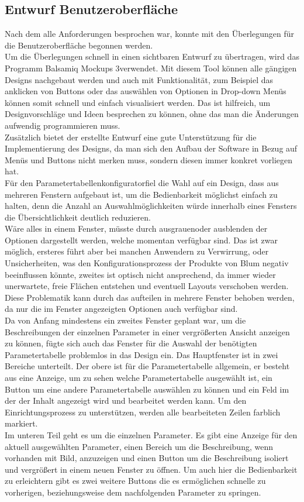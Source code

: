 \documentclass[12pt,a4paper]{article}
\begin{document}
\subsection{Entwurf Benutzeroberfläche}
Nach dem alle Anforderungen besprochen war, konnte mit den Überlegungen für die Benutzeroberfläche begonnen werden. \\
Um die Überlegungen schnell in einen sichtbaren Entwurf zu übertragen, wird das Programm \glqq Balsamiq Mockups 3\grqq\space verwendet. Mit diesem Tool können alle gängigen Designs nachgebaut werden und auch
 mit Funktionalität, zum Beispiel das anklicken von Buttons oder das auswählen von Optionen in Drop-down Menüs können somit schnell und einfach visualisiert werden. Das ist hilfreich, um Designvorschläge und Ideen besprechen zu können, ohne das man die Änderungen aufwendig programmieren muss.
\\Zusätzlich bietet der erstellte Entwurf eine gute Unterstützung für die Implementierung des Designs, da man sich den Aufbau der Software in Bezug auf Menüs und Buttons nicht merken muss, sondern diesen immer konkret vorliegen hat.
\\Für den \glqq Parametertabellenkonfigurator\grqq\space fiel die Wahl auf ein Design, dass aus mehreren Fenstern aufgebaut ist, um die Bedienbarkeit möglichst einfach zu halten, denn die Anzahl an Auswahlmöglichkeiten würde innerhalb eines Fensters die Übersichtlichkeit deutlich reduzieren.
\\ Wäre alles in einem Fenster, müsste durch \glqq ausgrauen\grqq\space oder ausblenden der Optionen dargestellt werden, welche momentan verfügbar sind. Das ist zwar möglich, ersteres führt aber bei manchen Anwendern zu Verwirrung, oder Unsicherheiten, was den Konfigurationsprozess der Produkte von Blum negativ beeinflussen könnte, zweites ist optisch nicht ansprechend, da immer wieder unerwartete, freie Flächen entstehen und eventuell Layouts verschoben werden. \\
Diese Problematik kann durch das aufteilen in mehrere Fenster behoben werden, da nur die im Fenster angezeigten Optionen auch verfügbar sind. 
\\Da von Anfang mindestens ein zweites Fenster geplant war, um die Beschreibungen der einzelnen Parameter in einer vergrößerten Ansicht anzeigen zu können, fügte sich auch das Fenster für die Auswahl der benötigten Parametertabelle problemlos in das Design ein. 
Das Hauptfenster ist in zwei Bereiche unterteilt. Der obere ist für die Parametertabelle allgemein, er besteht aus eine Anzeige, um zu sehen welche Parametertabelle ausgewählt ist, ein Button um eine andere Parametertabelle auswählen zu können und ein Feld im der der Inhalt angezeigt wird und bearbeitet werden kann. Um den Einrichtungsprozess zu unterstützen, werden alle bearbeiteten Zeilen farblich markiert. 
\\Im unteren Teil geht es um die einzelnen Parameter. Es gibt eine Anzeige für den aktuell ausgewählten Parameter, einen Bereich um die Beschreibung, wenn vorhanden mit Bild, anzuzeigen und einen Button um die Beschreibung isoliert und vergrößert in einem neuen Fenster zu öffnen. Um auch hier die Bedienbarkeit zu erleichtern gibt es zwei weitere Buttons die es ermöglichen schnelle zu vorherigen, beziehungsweise dem nachfolgenden Parameter zu springen.
\end{document}
